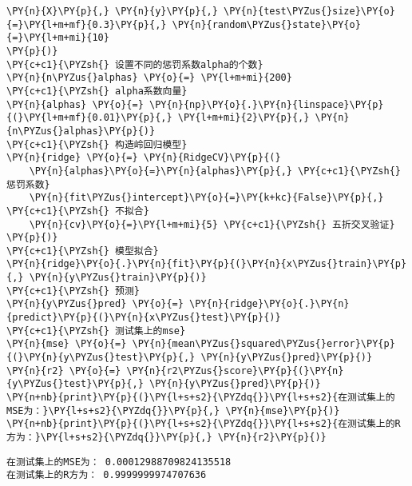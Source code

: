 \begin{Verbatim}[commandchars=\\\{\}]
    \PY{n}{X}\PY{p}{,} \PY{n}{y}\PY{p}{,} \PY{n}{test\PYZus{}size}\PY{o}{=}\PY{l+m+mf}{0.3}\PY{p}{,} \PY{n}{random\PYZus{}state}\PY{o}{=}\PY{l+m+mi}{10}
\PY{p}{)}
\PY{c+c1}{\PYZsh{} 设置不同的惩罚系数alpha的个数}
\PY{n}{n\PYZus{}alphas} \PY{o}{=} \PY{l+m+mi}{200}
\PY{c+c1}{\PYZsh{} alpha系数向量}
\PY{n}{alphas} \PY{o}{=} \PY{n}{np}\PY{o}{.}\PY{n}{linspace}\PY{p}{(}\PY{l+m+mf}{0.01}\PY{p}{,} \PY{l+m+mi}{2}\PY{p}{,} \PY{n}{n\PYZus{}alphas}\PY{p}{)}
\PY{c+c1}{\PYZsh{} 构造岭回归模型}
\PY{n}{ridge} \PY{o}{=} \PY{n}{RidgeCV}\PY{p}{(}
    \PY{n}{alphas}\PY{o}{=}\PY{n}{alphas}\PY{p}{,} \PY{c+c1}{\PYZsh{} 惩罚系数}
    \PY{n}{fit\PYZus{}intercept}\PY{o}{=}\PY{k+kc}{False}\PY{p}{,} \PY{c+c1}{\PYZsh{} 不拟合}
    \PY{n}{cv}\PY{o}{=}\PY{l+m+mi}{5} \PY{c+c1}{\PYZsh{} 五折交叉验证}
\PY{p}{)}
\PY{c+c1}{\PYZsh{} 模型拟合}
\PY{n}{ridge}\PY{o}{.}\PY{n}{fit}\PY{p}{(}\PY{n}{x\PYZus{}train}\PY{p}{,} \PY{n}{y\PYZus{}train}\PY{p}{)}
\PY{c+c1}{\PYZsh{} 预测}
\PY{n}{y\PYZus{}pred} \PY{o}{=} \PY{n}{ridge}\PY{o}{.}\PY{n}{predict}\PY{p}{(}\PY{n}{x\PYZus{}test}\PY{p}{)}
\PY{c+c1}{\PYZsh{} 测试集上的mse}
\PY{n}{mse} \PY{o}{=} \PY{n}{mean\PYZus{}squared\PYZus{}error}\PY{p}{(}\PY{n}{y\PYZus{}test}\PY{p}{,} \PY{n}{y\PYZus{}pred}\PY{p}{)}
\PY{n}{r2} \PY{o}{=} \PY{n}{r2\PYZus{}score}\PY{p}{(}\PY{n}{y\PYZus{}test}\PY{p}{,} \PY{n}{y\PYZus{}pred}\PY{p}{)}
\PY{n+nb}{print}\PY{p}{(}\PY{l+s+s2}{\PYZdq{}}\PY{l+s+s2}{在测试集上的MSE为：}\PY{l+s+s2}{\PYZdq{}}\PY{p}{,} \PY{n}{mse}\PY{p}{)}
\PY{n+nb}{print}\PY{p}{(}\PY{l+s+s2}{\PYZdq{}}\PY{l+s+s2}{在测试集上的R方为：}\PY{l+s+s2}{\PYZdq{}}\PY{p}{,} \PY{n}{r2}\PY{p}{)}
\end{Verbatim}

\begin{Verbatim}[commandchars=\\\{\}]
在测试集上的MSE为： 0.00012988709824135518
在测试集上的R方为： 0.9999999974707636
\end{Verbatim}
